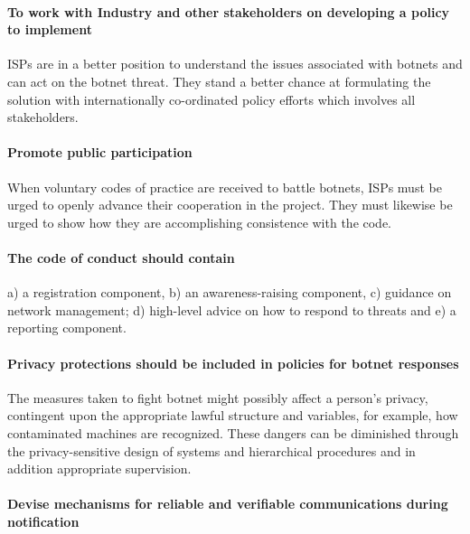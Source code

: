 

\paragraph{To work with Industry and other stakeholders on developing a policy to implement}

ISPs are in a better position to understand the issues associated with botnets and can act on the botnet threat. They stand a better chance at formulating the solution with internationally co-ordinated policy efforts which involves all stakeholders.

\paragraph{Promote public participation}

When voluntary codes of practice are received to battle botnets, ISPs must be urged to openly advance their cooperation in the project. They must likewise be urged to show how they are accomplishing consistence with the code.


\paragraph{The code of conduct should contain}

a) a registration component, b) an awareness-raising component, c) guidance on network management; d) high-level advice on how to respond to threats and e) a reporting component.

\paragraph{Privacy protections should be included in policies for botnet responses}

The measures taken to fight botnet might possibly affect a person’s privacy, contingent upon the appropriate lawful structure and variables, for example, how contaminated machines are recognized. These dangers can be diminished through the privacy-sensitive design of systems and hierarchical procedures and in addition appropriate supervision.

\paragraph{Devise mechanisms for reliable and verifiable communications during notification}

